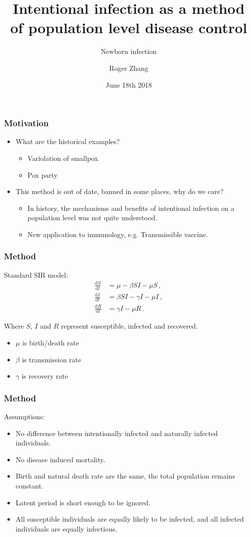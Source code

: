 \documentclass[12pt]{beamer}
\title{Intentional infection as a method of population level disease control}
\subtitle{Newborn infection}
\author{Roger Zhang}
\date{June 18th 2018}
\institute{McMaster University Department of Mathematics and Statistics}
\newcommand\dbyd[2]{\frac{\mathrm d{#1}}{\mathrm d{#2}}}
\begin{document}
\begin{frame}
\titlepage
\end{frame}
\begin{frame}
\frametitle{Motivation}
\begin{itemize}
\setlength\itemsep{10pt}
\item What are the historical examples?
\pause
\begin{itemize}
\setlength\itemsep{10pt}
\item Variolation of smallpox
\item Pox party
\end{itemize}
\pause
\item This method is out of date, banned in some places, why do we care?
\pause
\begin{itemize}
\setlength\itemsep{10pt}
\item In history, the mechanisms and benefits of intentional infection  on a population level was not quite understood.
\item New application to immunology, e.g. Transmissible vaccine.
\end{itemize}
\end{itemize}
\end{frame}
\begin{frame}
\frametitle{Method}
Standard SIR model:
\pause
\begin{equation}\label{1}
\begin{split}
\dbyd{S}{t}&=\mu- \beta SI-\mu S \,,\\
\dbyd{I}{t}&=\beta SI-\gamma I -\mu I\,,\\
\dbyd{R}{t}&=\gamma I-\mu R\,.
\end{split}
\end{equation}

Where $S$, $I$ and $R$ represent susceptible, infected and recovered.
\begin{itemize}
\setlength\itemsep{10pt}
\item $\mu$ is birth/death rate
\item $\beta$ is transmission rate
\item $\gamma$ is recovery rate
\end{itemize}
\end{frame}
\begin{frame}
\frametitle{Method}
Assumptions:
\begin{itemize}\itemsep10pt
\item No difference between intentionally infected and naturally infected individuals.
\item No disease induced mortality.
\item Birth and natural death rate are the same, the total population remains constant.
\item Latent period is short enough to be ignored.
\item All susceptible individuals are equally likely to be infected, and all infected individuals are equally infectious.
\end{itemize}
\end{frame}
\end{document}

